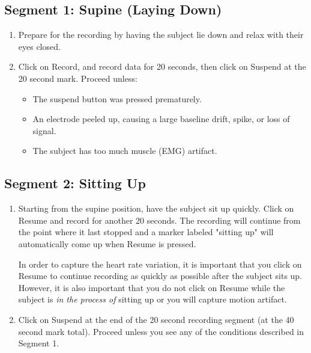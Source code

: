 \documentclass{article}
\begin{document}
\subsection*{Segment 1: Supine (Laying Down)}
\begin{enumerate}
	\item Prepare for the recording by having the subject lie down and relax with their eyes closed.
	\item Click on Record, and record data for 20 seconds, then click on Suspend at the 20 second mark. Proceed unless:
		\begin{itemize}
			\item The suspend button was pressed prematurely.
			\item An electrode peeled up, causing a large baseline drift, spike, or loss of signal.
			\item The subject has too much muscle (EMG) artifact.
		\end{itemize}
\end{enumerate}

\subsection*{Segment 2: Sitting Up}
\begin{enumerate}
	\item Starting from the supine position, have the subject sit up quickly. Click on Resume and record for another 20 seconds. The recording will continue from the point where it last stopped and a marker labeled "sitting up" will automatically come up when Resume is pressed.\begin{info}
In order to capture the heart rate variation, it is important that you click on Resume to continue recording as quickly as possible after the subject sits up. However, it is also important that you do not click on Resume while the subject is \textit{in the process of} sitting up or you will capture motion artifact.	
\end{info}

	\item Click on Suspend at the end of the 20 second recording segment (at the 40 second mark total). Proceed unless you see any of the conditions described in Segment 1.
\end{enumerate}
\end{document}
